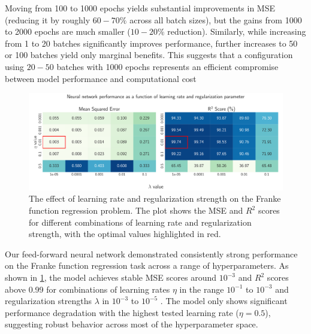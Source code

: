 Moving from 100 to 1000 epochs yields substantial improvements in MSE (reducing it by roughly $60-70\%$ across all batch sizes), but the gains from 1000 to 2000 epochs are much smaller ($10-20\%$ reduction). Similarly, while increasing from 1 to 20 batches significantly improves performance, further increases to 50 or 100 batches yield only marginal benefits. This suggests that a configuration using $20-50$ batches with 1000 epochs represents an efficient compromise between model performance and computational cost

\clearpage

\onecolumngrid
\begin{figure}[h!]
    \begin{minipage}{\textwidth}
        \centering
        \includegraphics[width = .9\textwidth]{../figs/c_eta_lambda.pdf}
        \caption{The effect of learning rate and regularization strength on the Franke function regression problem. The plot shows the MSE and \( R^2 \) scores for different combinations of learning rate and regularization strength, with the optimal values highlighted in red.}
        \label{fig:NN_Franke_eta_lambda}
    \end{minipage}
\end{figure}
\twocolumngrid

Our feed-forward neural network demonstrated consistently strong performance on the Franke function regression task across a range of hyperparameters. As shown in \cref{fig:NN_Franke_eta_lambda}, the model achieves stable MSE scores around $10^{-3}$ and $R^2$ scores above 0.99 for combinations of learning rates $ \eta $ in the range $ 10^{-1} $ to $ 10^{-3}$ and regularization strengths $ \lambda $ in $ 10^{-3} $ to $ 10^{-5}$ . The model only shows significant performance degradation with the highest tested learning rate ($\eta = 0.5$), suggesting robust behavior across most of the hyperparameter space.

